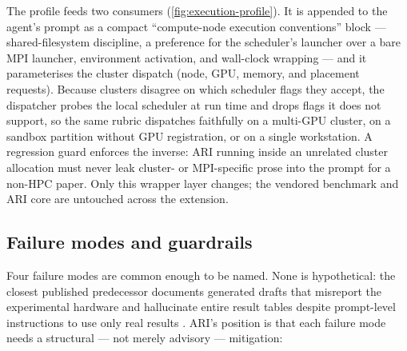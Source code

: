 The profile feeds two consumers (\cref{fig:execution-profile}). It is
appended to the agent's prompt as a compact ``compute-node execution
conventions'' block --- shared-filesystem discipline, a preference for
the scheduler's launcher over a bare MPI launcher, environment
activation, and wall-clock wrapping --- and it parameterises the
cluster dispatch (node, GPU, memory, and placement requests). Because
clusters disagree on which scheduler flags they accept, the dispatcher
probes the local scheduler at run time and drops flags it does not
support, so the same rubric dispatches faithfully on a multi-GPU
cluster, on a sandbox partition without GPU registration, or on a
single workstation. A regression guard enforces the inverse: ARI
running inside an unrelated cluster allocation must never leak
cluster- or MPI-specific prose into the prompt for a non-HPC paper.
Only this wrapper layer changes; the vendored benchmark and ARI core
are untouched across the extension.

\subsection{Failure modes and guardrails}\label{sec:paper:failures}

Four failure modes are common enough to be named. None is
hypothetical: the closest published predecessor documents generated
drafts that misreport the experimental hardware and hallucinate
entire result tables despite prompt-level instructions to use only
real results \cite{lu2024ai}. ARI's position is that each failure
mode needs a structural --- not merely advisory --- mitigation:

